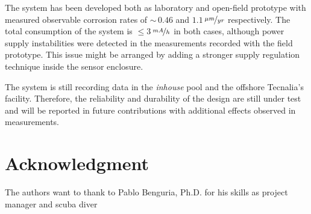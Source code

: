 \documentclass[journal,twoside,web]{ieeecolor}
\begin{document}
The system has been developed both as laboratory and open-field prototype with measured observable corrosion rates of $\sim$\,$0.46$ and $1.1$\,$\nicefrac{\mu m}{yr}$ respectively. The total consumption of the system is $\leq 3$\,$\nicefrac{mA}{h}$ in both cases, although power supply instabilities were detected in the measurements recorded with the field prototype. This issue might be arranged by adding a stronger supply regulation technique inside the sensor enclosure.

The system is still recording data in the \textit{inhouse} pool and the offshore Tecnalia's facility. Therefore, the reliability and durability of the design are still under test and will be reported in future contributions with additional effects observed in measurements.



\section*{Acknowledgment}

The authors want to thank to Pablo Benguria, Ph.D. for his skills as project manager and scuba diver
\end{document}
